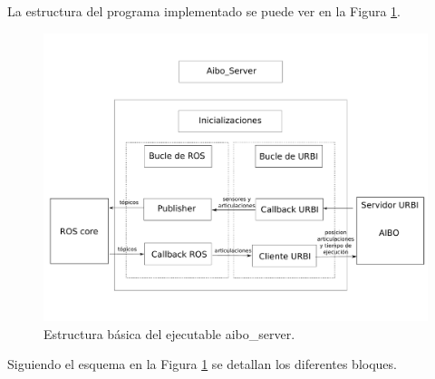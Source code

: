 \documentclass[12pt,a4paper,final,twoside]{book}
\begin{document}
La estructura del programa implementado se puede ver en la Figura \ref{fig:aiboserver}.
\begin{figure}[H]
	\centering
    \includegraphics[scale=0.35]{images/Aibo_Server.pdf}
	 \caption{Estructura básica del ejecutable aibo{\_}server.}
  \label{fig:aiboserver}
\end{figure}
Siguiendo el esquema en la Figura \ref{fig:aiboserver} se detallan los diferentes bloques.
\end{document}
